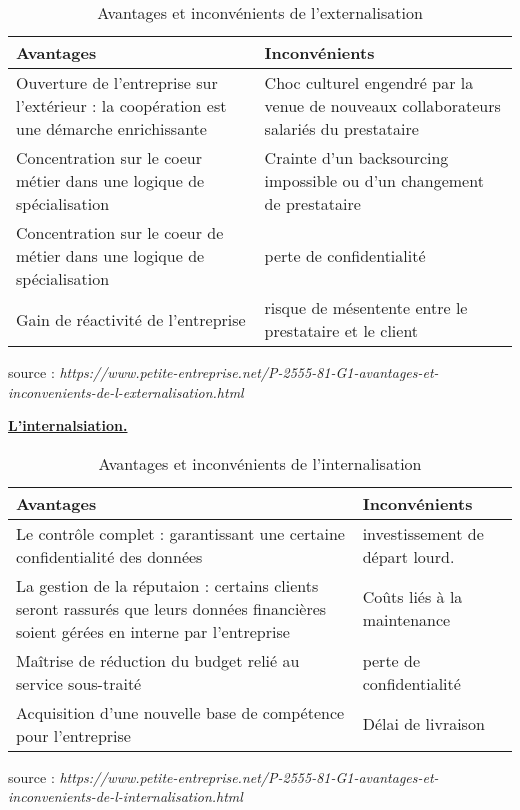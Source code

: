 \begin{table}[H]
	\caption{Avantages et inconvénients de l'externalisation}
	\label{Avantages et inconvénients de l'externalisation}
	\centering
	\begin{tabularx}{\linewidth}{|X|X|}
		\hline \rowcolor{lightgray}  
		\textbf  \textbf{Avantages} & \textbf{Inconvénients}\\
		\hline
		 Ouverture de l'entreprise sur l'extérieur : la coopération est une démarche enrichissante &  Choc culturel engendré par la venue de nouveaux collaborateurs salariés du prestataire\\
		\hline
		Concentration sur le coeur métier dans une logique de spécialisation &  Crainte d'un backsourcing impossible ou d'un changement de prestataire\\
		\hline
		 Concentration sur le coeur de métier dans une logique de spécialisation  & perte de confidentialité \\
		\hline
		 Gain de réactivité de l'entreprise &  risque de mésentente entre le prestataire et le client \\	
		\hline		
	\end{tabularx}
\end{table}{  source : \textit{https://www.petite-entreprise.net/P-2555-81-G1-avantages-et-inconvenients-de-l-externalisation.html}

\textbf{\underline{L'internalsiation.}}

\begin{table}[H]
	\caption{Avantages et inconvénients de l'internalisation}
	\label{Avantages et inconvénients de l''internalisation}
	\centering
	\begin{tabularx}{\linewidth}{|X|X|}
		\hline \rowcolor{lightgray}  
		\textbf  \textbf{Avantages} & \textbf{Inconvénients}\\
		\hline
		 Le contrôle complet : garantissant une certaine confidentialité des données &  investissement de départ lourd.\\
		\hline
		La gestion de la réputaion : certains clients seront rassurés que leurs données financières soient gérées en interne par l'entreprise &  Coûts liés à la maintenance\\
		\hline
		 Maîtrise de réduction du budget relié au service sous-traité  & perte de confidentialité \\
		\hline
		 Acquisition d'une nouvelle base de compétence pour l'entreprise &  Délai de livraison \\	
		\hline		
	\end{tabularx}
\end{table}{  source : \textit{https://www.petite-entreprise.net/P-2555-81-G1-avantages-et-inconvenients-de-l-internalisation.html}

}}
